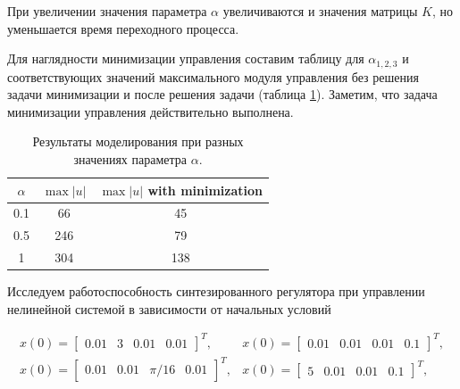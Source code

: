 При увеличении значения параметра $\alpha$ увеличиваются и значения матрицы $K$, но уменьшается время переходного процесса.

Для наглядности минимизации управления составим таблицу для $\alpha_{1,2,3}$ и соответствующих значений максимального модуля управления без решения задачи минимизации и после решения задачи (таблица \ref{4_tab_3}). Заметим, что задача минимизации управления действительно выполнена.

\begin{table}[h]
\centering
\caption{Результаты моделирования при разных значениях параметра $\alpha$.}
\label{4_tab_3}
\begin{tabular}{ccc}
\toprule
$\alpha$ & $\max |u|$ & $\max |u|$ with minimization\\
\midrule
0.1  &  66  &  45  \\
0.5  &  246  &  79   \\
1 &  304  &  138 \\ 
\bottomrule
\end{tabular}
\end{table}


Исследуем работоспособность синтезированного регулятора при управлении нелинейной системой в зависимости от начальных условий


\begin{equation*}
  \begin{matrix}
      x(0) = \begin{bmatrix}
          0.01 & 3 & 0.01 & 0.01
      \end{bmatrix}^T, & x(0) = \begin{bmatrix}
          0.01 & 0.01 & 0.01 & 0.1
      \end{bmatrix}^T,\\
      x(0) = \begin{bmatrix}
          0.01 & 0.01 & \pi /16 & 0.01
      \end{bmatrix}^T, & x(0) = \begin{bmatrix}
          5 & 0.01 & 0.01 & 0.1
      \end{bmatrix}^T,\\ 
 \end{matrix}
\end{equation*}

